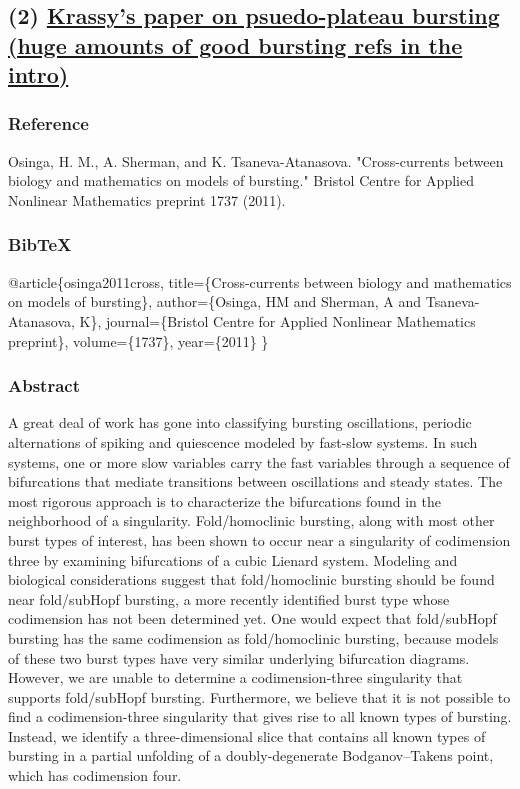\documentclass[11pt]{article}
\begin{document}
\subsection{(2) \href{https://research-information.bristol.ac.uk/files/3020939/osta\_preprint.pdf}{Krassy's paper on psuedo-plateau bursting (huge amounts of good bursting refs in the intro)}}
\label{sec:org2259114}
\subsubsection{Reference}
\label{sec:org445a005}
Osinga, H. M., A. Sherman, and K. Tsaneva-Atanasova. "Cross-currents between biology and mathematics on models of bursting." Bristol Centre for Applied Nonlinear Mathematics preprint 1737 (2011).

\subsubsection{BibTeX}
\label{sec:org2b92c20}
@article\{osinga2011cross,
  title=\{Cross-currents between biology and mathematics on models of bursting\},
  author=\{Osinga, HM and Sherman, A and Tsaneva-Atanasova, K\},
  journal=\{Bristol Centre for Applied Nonlinear Mathematics preprint\},
  volume=\{1737\},
  year=\{2011\}
\}

\subsubsection{Abstract}
\label{sec:org4491f55}
A great deal of work has gone into classifying bursting oscillations,
periodic alternations of spiking and quiescence modeled by fast-slow
systems. In such systems, one or more slow variables carry the fast
variables through a sequence of bifurcations that mediate transitions
between oscillations and steady states. The most rigorous approach is
to characterize the bifurcations found in the neighborhood of a
singularity. Fold/homoclinic bursting, along with most other burst
types of interest, has been shown to occur near a singularity of
codimension three by examining bifurcations of a cubic Lienard system.
Modeling and biological considerations suggest that fold/homoclinic
bursting should be found near fold/subHopf bursting, a more recently
identified burst type whose codimension has not been determined yet.
One would expect that fold/subHopf bursting has the same codimension
as fold/homoclinic bursting, because models of these two burst types
have very similar underlying bifurcation diagrams. However, we are
unable to determine a codimension-three singularity that supports
fold/subHopf bursting. Furthermore, we believe that it is not possible
to find a codimension-three singularity that gives rise to all known
types of bursting. Instead, we identify a three-dimensional slice that
contains all known types of bursting in a partial unfolding of a
doubly-degenerate Bodganov–Takens point, which has codimension four.
\end{document}

